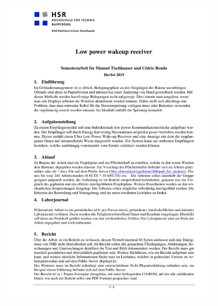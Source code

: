 \begin{figure}[H]
	\centering
	\includegraphics[trim= 0cm 0cm 0cm 0cm,page=2,width=16cm]{../Aufgabenstellung/LowPowerWakeupReiceiver.pdf}
\end{figure}

\newpage
